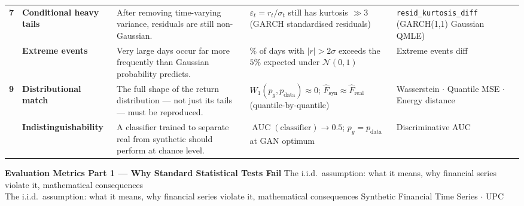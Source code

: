 \documentclass[10pt]{article}
\newcommand{\pagehead}[2]{%
  \begin{tcolorbox}[enhanced,arc=0pt,outer arc=0pt,boxrule=0pt,
    colback=Navy,colframe=Navy,
    top=5pt,bottom=5pt,left=8pt,right=8pt,
    before skip=0pt,after skip=10pt]
  {\color{white}\large\bfseries #1}%
  \ifx\relax#2\relax\else\\[1pt]{\color{blue!30!white}\small #2}\fi
  \hfill{\color{blue!20!white}\footnotesize Synthetic Financial Time Series $\cdot$ UPC}
  \end{tcolorbox}}
\begin{document}
\begin{longtable}{%
  >{\bfseries\centering}p{}
  >{\bfseries}p{}
  p{}
  p{}
  p{}}
\rowcolor{TabOdd}
7 & Conditional heavy tails &
  After removing time-varying variance, residuals are still non-Gaussian. &
  $\varepsilon_t = r_t/\sigma_t$ still has kurtosis $\gg 3$ (GARCH standardised residuals) &
  \texttt{resid\_kurtosis\_diff} (GARCH(1,1) Gaussian QMLE) \\

8 & Extreme events &
  Very large days occur far more frequently than Gaussian probability predicts. &
  \% of days with $|r| > 2\sigma$ exceeds the $5\%$ expected under $\mathcal{N}(0,1)$ &
  Extreme events diff \\

\rowcolor{TabOdd}
9 & Distributional match &
  The full shape of the return distribution --- not just its tails --- must be reproduced. &
  $W_1(p_g, p_\text{data}) \approx 0$;\; $\hat{F}_\text{syn} \approx \hat{F}_\text{real}$ (quantile-by-quantile) &
  Wasserstein $\cdot$ Quantile MSE $\cdot$ Energy distance \\

10 & Indistinguishability &
  A classifier trained to separate real from synthetic should perform at chance level. &
  $\operatorname{AUC}(\text{classifier}) \to 0.5$;\; $p_g = p_\text{data}$ at GAN optimum &
  Discriminative AUC \\

\bottomrule
\end{longtable}

\clearpage

\pagehead{Evaluation Metrics Part 1 --- Why Standard Statistical Tests Fail}
         {The i.i.d.\ assumption: what it means, why financial series violate it, mathematical consequences}
\end{document}
